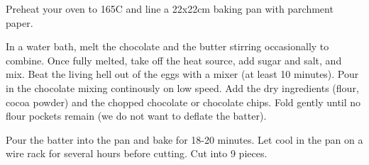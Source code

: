Preheat your oven to 165C and line a 22x22cm baking pan with parchment paper.

In a water bath, melt the chocolate and the butter stirring occasionally to
combine. Once fully melted, take off the heat source, add sugar and salt, and
mix. Beat the living hell out of the eggs with a mixer (at least 10 minutes).
Pour in the chocolate mixing continously on low speed. Add the dry ingredients
(flour, cocoa powder) and the chopped chocolate or chocolate chips. Fold gently
until no flour pockets remain (we do not want to deflate the batter).

Pour the batter into the pan and bake for 18-20 minutes. Let cool in the pan on
a wire rack for several hours before cutting. Cut into 9 pieces.
